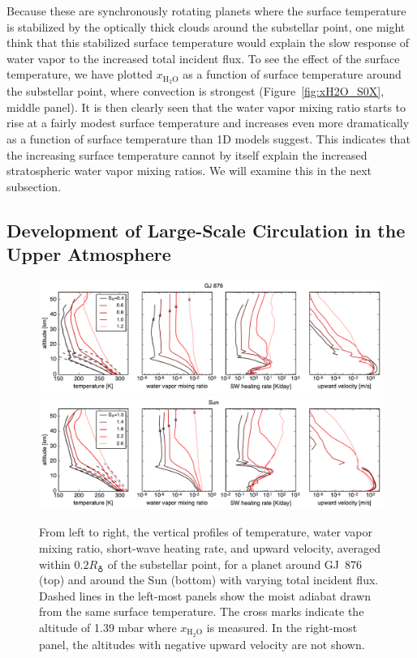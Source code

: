 \documentclass[11pt,numberedappendix,twocolappendix,]{emulateapj}
\def\water{H$_2$O}
\def\xwater{$x_\text{\water}$}
\def\preslevel{1.39 mbar}
\def\wv{water vapor}
\begin{document}
Because these are synchronously rotating planets where the surface temperature is stabilized by the optically thick clouds around the substellar point, one might think that this stabilized surface temperature would explain the slow  response of \wv{} to the increased total incident flux. 
To see the effect of the surface temperature, we have plotted \xwater{} as a function of surface temperature around the substellar point, where convection is strongest (Figure~\ref{fig:xH2O_S0X}, middle panel). 
It is then clearly seen that the \wv{}  mixing ratio starts to rise at a fairly modest surface temperature and increases even more dramatically as a function of surface temperature than 1D models suggest. 
This indicates that the increasing surface temperature cannot by itself explain the increased stratospheric \wv{} mixing ratios. 
We will examine this in the next subsection. 

\subsection{Development of Large-Scale Circulation in the Upper Atmosphere}
\label{ss:result_omega}


\begin{figure}[htb]
    \begin{center}
    \includegraphics[width=1\hsize]{AqOH0TLS_GJ876_temp_xH2O_vz_heat.pdf}
    \includegraphics[width=1\hsize]{AqOH0TLS_Sun_temp_xH2O_vz_heat.pdf}
    \end{center}
\caption{From left to right, the vertical profiles of temperature, \wv{} mixing ratio, short-wave heating rate, and upward velocity, averaged within $0.2R_\earth$ of the substellar point, for a planet around GJ~876 (top) and around the Sun (bottom) with varying total incident flux. Dashed lines in the left-most panels show the moist adiabat drawn from the same surface temperature. The cross marks indicate the altitude of \preslevel{} where \xwater{} is measured. In the right-most panel, the altitudes with negative upward velocity are not shown. }
\label{fig:AqOH0TLS_GJ876_temp_xH2O_vz_heat}
\end{figure}
\end{document}
